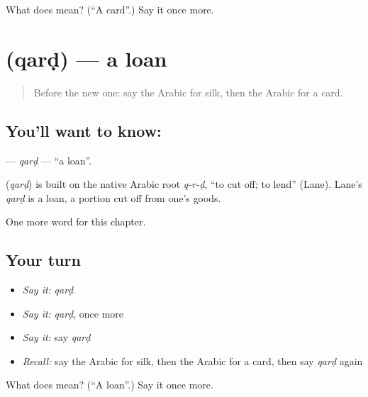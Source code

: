 \begin{tcolorbox}[breakable,colback=teal!4,colframe=teal!35!black,title={Before you move on}]
What does  mean? (\textquotedblleft{}A card\textquotedblright{}.) Say it once more.
\end{tcolorbox}
\section[\texorpdfstring{\ar{قرض} (qarḍ)}{قرض (qarḍ)}]{ (qarḍ) — a loan}

\label{lesson:AR-C220-qard}



\begin{quote}
Before the new one: say the Arabic for silk, then the Arabic for a card.
\end{quote}

\subsection*{You'll want to know: }
\textbf{} — \emph{qarḍ} — \textquotedblleft{}a loan\textquotedblright{}.

\begin{cousinweb}
\textbf{} (\emph{qarḍ}) is built on the native Arabic root \emph{q-r-ḍ}, \textquotedblleft{}to cut off; to lend\textquotedblright{} (Lane). Lane's \emph{qarḍ} is a loan, a portion cut off from one's goods.
\end{cousinweb}

\begin{grammarlens}[title={What you've built}]
One more word for this chapter.
\end{grammarlens}

\subsection*{Your turn}
\begin{itemize}
\raggedright
  \item \emph{Say it:} \emph{qarḍ}
  \item \emph{Say it:} \emph{qarḍ}, once more
  \item \emph{Say it:} say \emph{qarḍ}
  \item \emph{Recall:} say the Arabic for silk, then the Arabic for a card, then say \emph{qarḍ} again
\end{itemize}

\begin{tcolorbox}[breakable,colback=teal!4,colframe=teal!35!black,title={Before you move on}]
What does  mean? (\textquotedblleft{}A loan\textquotedblright{}.) Say it once more.
\end{tcolorbox}

